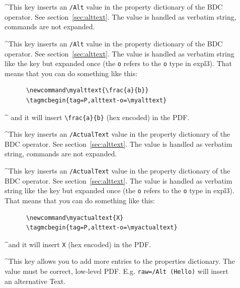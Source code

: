 \documentclass[DIV=12,parskip=half-,bibliography=totoc]{scrartcl}
\newcommand\PDF{PDF}
\begin{document}
\begin{description}
  \item[]
   \TagP^This key inserts an \texttt{/Alt} value in the property dictionary of the BDC operator. See section~\ref{sec:alttext}. The value is handled as verbatim string, commands are not expanded.\Pmeti
  \item[]
  \TagP^This key inserts an \texttt{/Alt} value in the property dictionary of the BDC operator. See section~\ref{sec:alttext}. The value is handled as verbatim string like the key  but expanded once (the \texttt{o} refers to the \texttt{o} type in expl3).
  That means that you can do something like this: \TagPend
      \begin{lstlisting}
      \newcommand\myalttext{\frac{a}{b}}
      \tagmcbegin{tag=P,alttext-o=\myalttext}
      \end{lstlisting}
  \tagmcend\tagstructend

  \TagP^    and it will insert \verb+\frac{a}{b}+  (hex encoded) in the \PDF{}.\Pmeti

  \item[]
  \TagP^This key inserts an \texttt{/ActualText} value in the property dictionary of the BDC operator. See section~\ref{sec:alttext}. The value is handled as verbatim string, commands are not expanded.\Pmeti


  \item[]
  \TagP^This key inserts an \texttt{/ActualText} value in the property dictionary of the BDC operator. See section~\ref{sec:alttext}. The value is handled as verbatim string like the key  but expanded once (the \texttt{o} refers to the \texttt{o} type in expl3). That means that you can do something like this:\TagPend

      \begin{lstlisting}
      \newcommand\myactualtext{X}
      \tagmcbegin{tag=P,alttext-o=\myactualtext}
      \end{lstlisting}
 \tagmcend\tagstructend


 \TagP^and it will insert \verb+X+ (hex encoded)  in the \PDF{}.\Pmeti

  \item[]
  \TagP^This key allows you to add more entries to the properties dictionary. The value must be correct, low-level \PDF{}. E.g. \verb+raw=/Alt (Hello)+ will insert an alternative Text.\Pmeti
\end{description}
\end{document}
